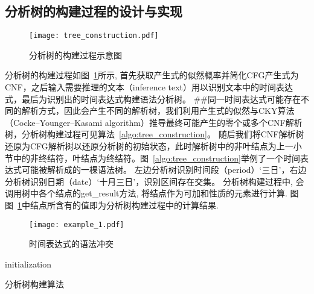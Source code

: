 \subsection{分析树的构建过程的设计与实现}

\begin{figure}[h]
    \centering
    \texttt{[image: tree\_construction.pdf]}
    \caption{分析树的构建过程示意图}
    \label{fig:tree_construction}
\end{figure}

分析树的构建过程如图~\ref{fig:tree_construction}所示, 首先获取产生式的似然概率并简化CFG产生式为CNF，之后输入需要推理的文本（inference text）用以识别文本中的时间表达式，最后为识别出的时间表达式构建语法分析树。
##同一时间表达式可能存在不同的解析方式，因此会产生不同的解析树，我们利用产生式的似然与CKY算法（Cocke–Younger–Kasami algorithm）推导最终可能产生的零个或多个CNF解析树，分析树构建过程可见算法~\ref{algo:tree_construction}。
随后我们将CNF解析树还原为CFG解析树以还原分析树的初始状态，此时解析树中的非叶结点为上一小节中的非终结符，叶结点为终结符。图~\ref{algo:tree_construction}举例了一个时间表达式可能被解析成的一棵语法树。
左边分析树识别时间段（period）‘三日’，右边分析树识别日期（date）‘十月三日’，识别区间存在交集。 分析树构建过程中, 会调用树中各个结点的get\_result方法, 将结点作为可加和性质的元素进行计算. 图
图~\ref{fig:tree_construction}中结点所含有的值即为分析树构建过程中的计算结果.


\begin{figure}[h]
    \centering
    \texttt{[image: example\_1.pdf]}
    \caption{时间表达式的语法冲突}
    \label{fig:example_1}
\end{figure}

\begin{algorithm}[h]
    \SetAlgoLined
    initialization\;
     {
    }
    \caption{分析树构建算法}
    \label{algo:tree_construction}
\end{algorithm}


